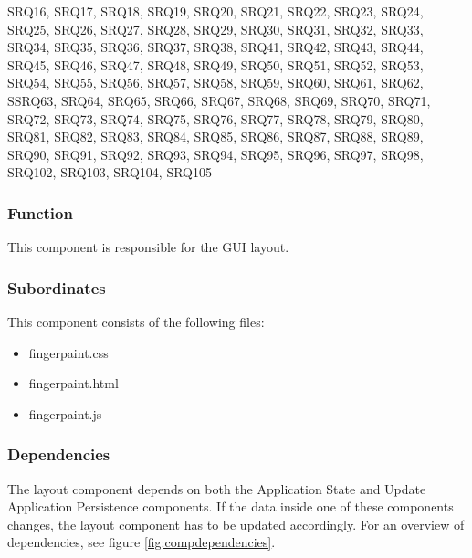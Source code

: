 \noindent SRQ16, SRQ17, SRQ18, SRQ19, SRQ20, SRQ21, SRQ22, SRQ23, SRQ24, SRQ25, SRQ26, SRQ27, SRQ28, SRQ29, SRQ30, SRQ31, SRQ32, SRQ33, SRQ34, SRQ35, SRQ36, SRQ37, SRQ38, SRQ41, SRQ42, SRQ43, SRQ44, SRQ45, SRQ46, SRQ47, SRQ48, SRQ49, SRQ50, SRQ51, SRQ52, SRQ53, SRQ54, SRQ55, SRQ56, SRQ57, SRQ58, SRQ59, SRQ60, SRQ61, SRQ62, SSRQ63, SRQ64, SRQ65, SRQ66, SRQ67, SRQ68, SRQ69, SRQ70, SRQ71, SRQ72, SRQ73, SRQ74, SRQ75, SRQ76, SRQ77, SRQ78, SRQ79, SRQ80, SRQ81, SRQ82, SRQ83, SRQ84, SRQ85, SRQ86, SRQ87, SRQ88, SRQ89, SRQ90, SRQ91, SRQ92, SRQ93, SRQ94, SRQ95, SRQ96, SRQ97, SRQ98, SRQ102, SRQ103, SRQ104, SRQ105

\subsubsection*{Function}
This component is responsible for the GUI layout.

\subsubsection*{Subordinates}
This component consists of the following files:
\begin{itemize}
\item fingerpaint.css
\item fingerpaint.html
\item fingerpaint.js
\end{itemize}

\subsubsection*{Dependencies}
The layout component depends on both the Application State and Update Application Persistence components. If the data inside one of these components changes, the layout component has to be updated accordingly. For an overview of dependencies, see figure \ref{fig:compdependencies}.

